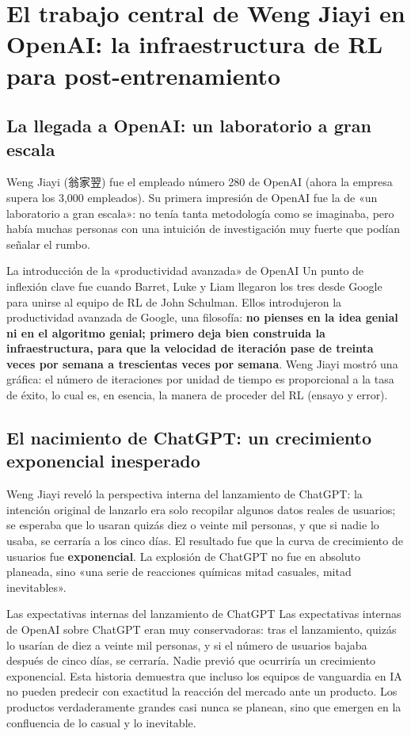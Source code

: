 \section{El trabajo central de Weng Jiayi en OpenAI: la infraestructura de RL para post-entrenamiento}

\subsection{La llegada a OpenAI: un laboratorio a gran escala}

Weng Jiayi (翁家翌) fue el empleado número 280 de OpenAI (ahora la empresa supera los 3,000 empleados). Su primera impresión de OpenAI fue la de «un laboratorio a gran escala»: no tenía tanta metodología como se imaginaba, pero había muchas personas con una intuición de investigación muy fuerte que podían señalar el rumbo.

\begin{importantbox}{La introducción de la «productividad avanzada» de OpenAI}
Un punto de inflexión clave fue cuando Barret, Luke y Liam llegaron los tres desde Google para unirse al equipo de RL de John Schulman. Ellos introdujeron la productividad avanzada de Google, una filosofía: \textbf{no pienses en la idea genial ni en el algoritmo genial; primero deja bien construida la infraestructura, para que la velocidad de iteración pase de treinta veces por semana a trescientas veces por semana}. Weng Jiayi mostró una gráfica: el número de iteraciones por unidad de tiempo es proporcional a la tasa de éxito, lo cual es, en esencia, la manera de proceder del RL (ensayo y error).
\end{importantbox}

\subsection{El nacimiento de ChatGPT: un crecimiento exponencial inesperado}

Weng Jiayi reveló la perspectiva interna del lanzamiento de ChatGPT: la intención original de lanzarlo era solo recopilar algunos datos reales de usuarios; se esperaba que lo usaran quizás diez o veinte mil personas, y que si nadie lo usaba, se cerraría a los cinco días. El resultado fue que la curva de crecimiento de usuarios fue \textbf{exponencial}. La explosión de ChatGPT no fue en absoluto planeada, sino «una serie de reacciones químicas mitad casuales, mitad inevitables».

\begin{knowledgebox}{Las expectativas internas del lanzamiento de ChatGPT}
Las expectativas internas de OpenAI sobre ChatGPT eran muy conservadoras: tras el lanzamiento, quizás lo usarían de diez a veinte mil personas, y si el número de usuarios bajaba después de cinco días, se cerraría. Nadie previó que ocurriría un crecimiento exponencial. Esta historia demuestra que incluso los equipos de vanguardia en IA no pueden predecir con exactitud la reacción del mercado ante un producto. Los productos verdaderamente grandes casi nunca se planean, sino que emergen en la confluencia de lo casual y lo inevitable.
\end{knowledgebox}

